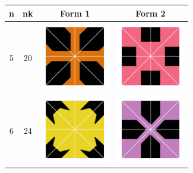 \documentclass{beamer}
\begin{document}
\begin{frame}
\begin{table}
\centering
\begin{tabular}{c|c|c|c}
n & nk & Form 1 & Form 2 \\\hline
5 & 20 & \includegraphics[width=3cm]{20tv} &\includegraphics[width=3cm]{20se} \\\hline
6 & 24 & \includegraphics[width=3cm]{24_tv} &\includegraphics[width=3cm]{24se}\\\hline
\end{tabular}
\end{table}
\end{frame}
\end{document}
